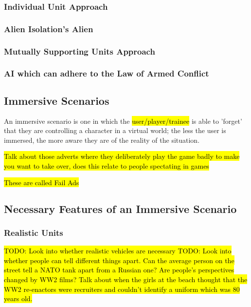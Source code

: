 \documentclass{article}
\begin{document}
\subsubsection{Individual Unit Approach}

\subsubsection{Alien Isolation's Alien}

\subsubsection{Mutually Supporting Units Approach}

\subsubsection{AI which can adhere to the Law of Armed Conflict}

\subsection{Immersive Scenarios}

An immersive scenario is one in which the \hl{user/player/trainee} is able to 'forget' that they are controlling a character in a virtual world; the less the user is immersed, the more aware they are of the reality of the situation.

\hl{Talk about those adverts where they deliberately play the game badly to make you want to take over, does this relate to people spectating in games}


\hl{These are called Fail Ads} 

\subsection{Necessary Features of an Immersive Scenario}

\subsubsection{Realistic Units}

\hl{TODO: Look into whether realistic vehicles are necessary
TODO: Look into whether people can tell different things apart. Can the average person on the street tell a NATO tank apart from a Russian one? Are people's perspectives changed by WW2 films? Talk about when the girls at the beach thought that the WW2 re-enactors were recruiters and couldn't identify a uniform which was 80 years old.}
\end{document}

